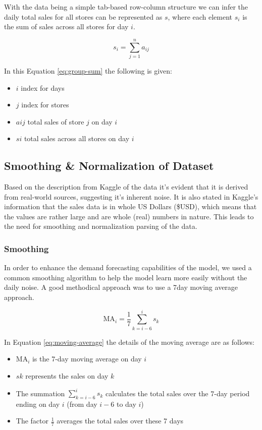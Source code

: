 \documentclass[10pt, conference, compsoc]{IEEEtran}
\begin{document}
With the data being a simple tab-based row-column structure we can infer the daily total sales for all stores can be represented as $s$, where each element $s_i$ is the sum of sales across all stores for day $i$.

\begin{equation}
s_i = \sum_{j=1}^{n} a_{ij}
\label{eq:group-sum}
\end{equation}

In this Equation \ref{eq:group-sum} the following is given:
\begin{itemize}
    \item $i$ index for days
    \item $j$ index for stores
    \item $aij$ total sales of store $j$ on day $i$
    \item $si$ total sales across all stores on day $i$
\end{itemize}


\subsection{Smoothing \& Normalization of Dataset}
Based on the description from Kaggle\cite{demand-forecasting-kernels-only} of the data it's evident that it is derived from real-world sources, suggesting it's inherent noise. It is also stated in Kaggle's information that the sales data is in whole US Dollars (\$USD), which means that the values are rather large and are whole (real) numbers in nature. This leads to the need for smoothing and normalization parsing of the data.


\subsubsection{Smoothing}
In order to enhance the demand forecasting capabilities of the model, we used a common smoothing algorithm\cite{improved-sales-forecasting} to help the model learn more easily without the daily noise. A good methodical approach was to use a 7day moving average approach.

\begin{equation}
\text{MA}_i = \frac{1}{7} \sum_{k=i-6}^{i} s_k
\label{eq:moving-average}
\end{equation}

In Equation \ref{eq:moving-average} the details of the moving average are as follows:
\begin{itemize}
    \item $\text{MA}_i$ is the 7-day moving average on day $i$
    \item $sk$ represents the sales on day $k$
    \item The summation $\sum_{k=i-6}^{i} s_k$ calculates the total sales over the 7-day period ending on day $i$ (from day $i-6$ to day $i$)
    \item The factor $\frac{1}{7}$ averages the total sales over these 7 days
\end{itemize}
\end{document}
